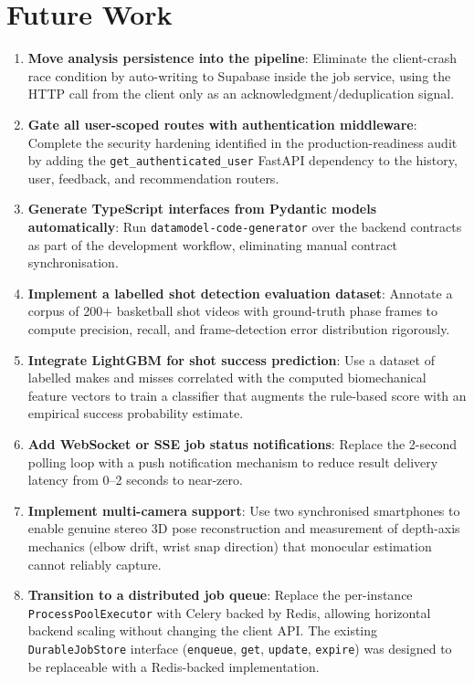 \section{Future Work}
\label{sec:future_work}

\begin{enumerate}[label=\arabic*.]
  \item \textbf{Move analysis persistence into the pipeline}: Eliminate the client-crash race condition by auto-writing to Supabase inside the job service, using the HTTP call from the client only as an acknowledgment/deduplication signal.
  \item \begin{sloppypar}\textbf{Gate all user-scoped routes with authentication middleware}: Complete the security hardening identified in the production-readiness audit by adding the \lstinline|get_authenticated_user| FastAPI dependency to the history, user, feedback, and recommendation routers.\end{sloppypar}
  \item \textbf{Generate TypeScript interfaces from Pydantic models automatically}: Run \lstinline|datamodel-code-generator| over the backend contracts as part of the development workflow, eliminating manual contract synchronisation.
  \item \textbf{Implement a labelled shot detection evaluation dataset}: Annotate a corpus of 200+ basketball shot videos with ground-truth phase frames to compute precision, recall, and frame-detection error distribution rigorously.
  \item \textbf{Integrate LightGBM for shot success prediction}: Use a dataset of labelled makes and misses correlated with the computed biomechanical feature vectors to train a classifier that augments the rule-based score with an empirical success probability estimate.
  \item \textbf{Add WebSocket or SSE job status notifications}: Replace the 2-second polling loop with a push notification mechanism to reduce result delivery latency from 0--2 seconds to near-zero.
  \item \textbf{Implement multi-camera support}: Use two synchronised smartphones to enable genuine stereo 3D pose reconstruction and measurement of depth-axis mechanics (elbow drift, wrist snap direction) that monocular estimation cannot reliably capture.
  \item \begin{sloppypar}\textbf{Transition to a distributed job queue}: Replace the per-instance \lstinline|ProcessPoolExecutor| with Celery backed by Redis, allowing horizontal backend scaling without changing the client API. The existing \lstinline|DurableJobStore| interface (\lstinline|enqueue|, \lstinline|get|, \lstinline|update|, \lstinline|expire|) was designed to be replaceable with a Redis-backed implementation.\end{sloppypar}
\end{enumerate}

